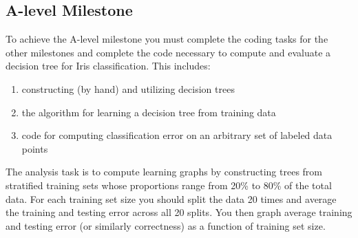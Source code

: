 \documentclass[]{tufte-handout}
\begin{document}
\subsection*{A-level Milestone}

To achieve the A-level milestone you must complete the coding tasks for the other milestones and complete the code necessary to compute and evaluate a decision tree for Iris classification. This includes:
\begin{enumerate}
  \item constructing (by hand) and utilizing decision trees
  \item the algorithm for learning a decision tree from training data
  \item code for computing classification error on an arbitrary set of labeled data points
\end{enumerate}

The analysis task is to compute learning graphs by constructing trees from stratified training sets whose proportions range from 20\% to 80\% of the total data. For each training set size you should split the data 20 times and average the training and testing error across all 20 splits. You then graph average training and testing error (or similarly correctness) as a function of training set size.



\end{document}
